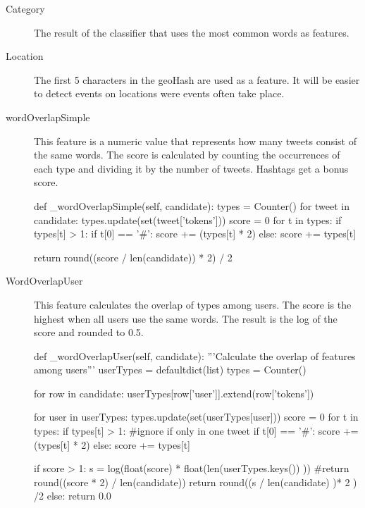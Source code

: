 \documentclass[
10pt, %
a4paper, %
oneside, %
headinclude,footinclude, %
BCOR5mm, %
]{scrartcl}
\begin{document}
\begin{description}

\item[Category]
The result of the classifier that uses the most common words as features. 

\item[Location]
The first 5 characters in the geoHash are used as a feature. It will be easier to detect events on locations were events often take place.

\item[wordOverlapSimple]
This feature is a numeric value that represents how many tweets consist of the same words. The score is calculated by counting the occurrences of each type and dividing it by the number of tweets. Hashtags get a bonus score.

\begin{python}
def _wordOverlapSimple(self, candidate):
        types = Counter()
        for tweet in candidate:
            types.update(set(tweet['tokens']))
        score = 0
        for t in types:
            if types[t] > 1:
                if t[0] == '#':
                    score += (types[t] * 2)
                else:
                    score += types[t]

        return round((score / len(candidate)) * 2) / 2
\end{python}
\newpage
\item[WordOverlapUser]
This feature calculates the overlap of types among users. The score is the highest when all users use the same words. The result is the log of the score and rounded to 0.5.

\begin{python}
def _wordOverlapUser(self, candidate):
        '''Calculate the overlap of features among users'''
        userTypes = defaultdict(list)
        types = Counter()

        for row in candidate:
            userTypes[row['user']].extend(row['tokens'])
        
        for user in userTypes:
            types.update(set(userTypes[user]))
        score = 0
        for t in types:
            if types[t] > 1: #ignore if only in one tweet
                if t[0] == '#':
                    score += (types[t] * 2)
                else:
                    score += types[t]

        if score > 1:
            s = log(float(score) * float(len(userTypes.keys()) )) 
            #return round((score * 2) / len(candidate))
            return round((s / len(candidate) )* 2 ) /2 
        else:
            return 0.0
\end{python}

\end{description}
\end{document}
